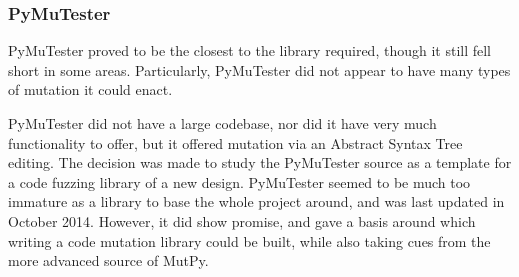 \subsubsection{PyMuTester}
\label{fuzzing_pymutester}
PyMuTester\cite{GitHu12:online} proved to be the closest to the library required, though it still fell short in some areas. Particularly, PyMuTester did not appear to have many types of mutation it could enact. \par
PyMuTester did not have a large codebase\cite{GitHu12:online}, nor did it have very much functionality to offer, but it offered mutation via an Abstract Syntax Tree editing. The decision was made to study the PyMuTester source as a template for a code fuzzing library of a new design. PyMuTester seemed to be much too immature as a library to base the whole project around, and was last updated in October 2014. However, it did show promise, and gave a basis around which writing a code mutation library could be built, while also taking cues from the more advanced source of MutPy\cite{khala8:online}.  \par%
